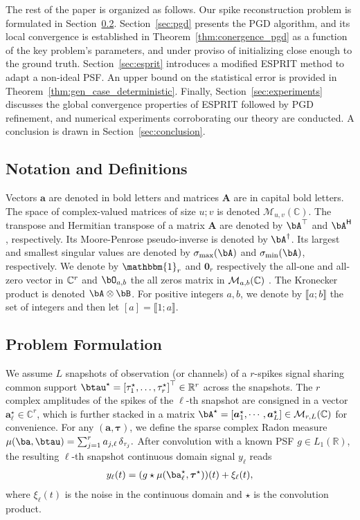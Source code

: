 \documentclass[conference,english]{IEEEtran}
\begin{document}
The rest of the paper is organized as follows. Our spike reconstruction problem is formulated in Section~\ref{sec:model}. 
Section~\ref{sec:pgd} presents the PGD algorithm, and its local convergence is established in Theorem~\ref{thm:conergence_pgd} as a function of the key problem's parameters, and under proviso of initializing close enough to the ground truth. Section~\ref{sec:esprit} introduces a modified ESPRIT method to adapt a non-ideal PSF. An upper bound on the statistical error is provided in  Theorem~\ref{thm:gen_case_deterministic}. Finally, Section~\ref{sec:experiments} discusses the global convergence properties of ESPRIT followed by PGD refinement, and numerical experiments corroborating our theory are conducted. A conclusion is drawn in Section~\ref{sec:conclusion}.

\subsection{Notation and Definitions}

Vectors $\bm{a}$ are denoted in bold letters and matrices $\bm{A}$ are in capital bold letters. The space of complex-valued matrices of size $u;v$ is denoted $\mathcal{M}_{u,v}(\mathbb{C})$. The transpose and Hermitian transpose of a matrix $\bm{A}$ are denoted by $\bA^\top$ and $\bA^\herm$, respectively. Its Moore-Penrose pseudo-inverse is denoted by $\bA^{\dagger}$. Its largest and smallest singular values are denoted by $\sigma_{\text{max}}(\bA)$ and $\sigma_{\text{min}}(\bA)$, respectively.  
We denote by $\mathbbm{1}_r$ and $\bm{0}_r$ respectively the all-one and all-zero vector in $\mathbb{C}^r$ and $\bO_{a,b}$ the all zeros matrix in $\mathcal{M}_{a,b}(\mathbb{C})$ .
The Kronecker product is denoted $\bA \otimes \bB$.
For positive integers $a,b$, we denote by $\llbracket a;b\rrbracket$ the set of integers and then let $[a] = \llbracket 1;a\rrbracket$.

\subsection{Problem Formulation}
\label{sec:model}

We assume $L$ snapshots of observation (or channels) of a $r$-spikes signal sharing common support $\btau^{\star} = {[\tau^{\star}_1, \dots, \tau^{\star}_{r}]}^\top \in \mathbb{R}^{r}$ across the snapshots. The $r$ complex amplitudes of the spikes of the $\ell$-th snapshot are consigned in a vector $\bm{a}_\ell^\star \in \mathbb{C}^r$, which is further stacked in a matrix
$\bA^\star = \left[\bm{a}_1^\star, \cdots, \bm{a}_L^\star \right] \in \mathcal{M}_{r,L}(\mathbb{C})$
for convenience.
For any $(\bm{a}, \bm{\tau})$, we define the sparse complex Radon measure $\mu(\ba, \btau)
= \sum_{j=1}^r a_{j,\ell} \,\delta_{\tau_j}.$
After convolution with a known PSF $g \in L_1(\mathbb{R})$, the resulting $\ell$-th snapshot continuous domain signal $y_\ell$ reads
\begin{align*}
y_\ell(t) = (g \star \mu(\ba_\ell^\star, \bm{\tau}^\star))(t) + \xi_\ell(t),
\end{align*} where $\xi_\ell(t)$ is the noise in the continuous domain and $\star$ is the convolution product. 
\end{document}
